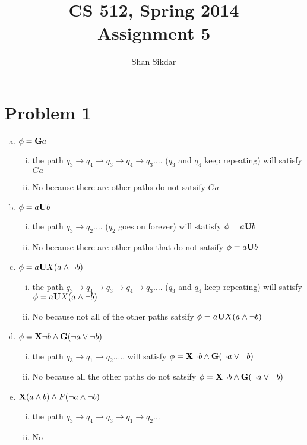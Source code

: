 \documentclass[11pt,leqno,fleqn]{article}
\title{CS 512, Spring 2014
       \\[1ex]
       \textbf{Assignment 5}}
\author{Shan Sikdar}
\date{} %
\begin{document}
\maketitle

\section{Problem 1}
\begin{enumerate}[(a)]
\item $\phi = \bold{G}a$
 \begin{enumerate}[(i)]
 \item the path $q_3 \to q_4 \to q_3 \to q_4 \to q_3$.... ($q_3$ and $q_4$ keep repeating) will satisfy $Ga$
 \item No because there are other paths do not satsify $Ga$
\end{enumerate}

\item $\phi = a \bold{U}b$
 \begin{enumerate}[(i)]
 \item the path $q_3 \to q_2....$ ($q_2$ goes on forever) will statisfy $\phi = a \bold{U}b$
 \item  No because there are other paths that do not satsify $\phi = a \bold{U}b$
\end{enumerate}

\item $\phi = a \bold{U} X(a \land \neg{b})$
 \begin{enumerate}[(i)]
 \item the path $q_3 \to q_4 \to q_3 \to q_4 \to q_3$.... ($q_3$ and $q_4$ keep repeating) will satisfy  $\phi = a \bold{U} X(a \land \neg{b})$
 \item No because not all of the other paths satsify $\phi = a \bold{U} X(a \land \neg{b})$
\end{enumerate}

\item $\phi = \bold{X} \neg b \land \bold{G}(\neg a \lor \neg b)$
 \begin{enumerate}[(i)]
 \item the path $q_3 \to q_1 \to q_2.....$ will satisfy $\phi = \bold{X} \neg b \land \bold{G}(\neg a \lor \neg b)$
 \item No because all the other paths do not satsify  $\phi = \bold{X} \neg b \land \bold{G}(\neg a \lor \neg b)$
\end{enumerate}

\item $\bold{X}(a \land b) \land F(\neg a \land \neg b)$
 \begin{enumerate}[(i)]
 \item the path $q_3 \to q_4 \to q_3 \to q_1 \to q_2$... 
 \item No
\end{enumerate}


\end{enumerate}
\end{document}

